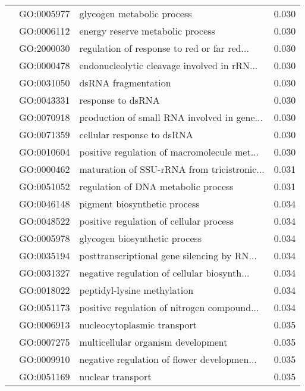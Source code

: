 \begin{longtable}{lllr}
   & GO:0005977 &                   glycogen metabolic process &         0.030 \\
   & GO:0006112 &             energy reserve metabolic process &         0.030 \\
   & GO:2000030 &  regulation of response to red or far red... &         0.030 \\
   & GO:0000478 &  endonucleolytic cleavage involved in rRN... &         0.030 \\
   & GO:0031050 &                          dsRNA fragmentation &         0.030 \\
   & GO:0043331 &                            response to dsRNA &         0.030 \\
   & GO:0070918 &  production of small RNA involved in gene... &         0.030 \\
   & GO:0071359 &                   cellular response to dsRNA &         0.030 \\
   & GO:0010604 &  positive regulation of macromolecule met... &         0.030 \\
   & GO:0000462 &  maturation of SSU-rRNA from tricistronic... &         0.031 \\
   & GO:0051052 &          regulation of DNA metabolic process &         0.031 \\
   & GO:0046148 &                 pigment biosynthetic process &         0.034 \\
   & GO:0048522 &      positive regulation of cellular process &         0.034 \\
   & GO:0005978 &                glycogen biosynthetic process &         0.034 \\
   & GO:0035194 &  posttranscriptional gene silencing by RN... &         0.034 \\
   & GO:0031327 &  negative regulation of cellular biosynth... &         0.034 \\
   & GO:0018022 &                  peptidyl-lysine methylation &         0.034 \\
   & GO:0051173 &  positive regulation of nitrogen compound... &         0.034 \\
   & GO:0006913 &                  nucleocytoplasmic transport &         0.035 \\
   & GO:0007275 &           multicellular organism development &         0.035 \\
   & GO:0009910 &  negative regulation of flower developmen... &         0.035 \\
   & GO:0051169 &                            nuclear transport &         0.035 \\

\end{longtable}
